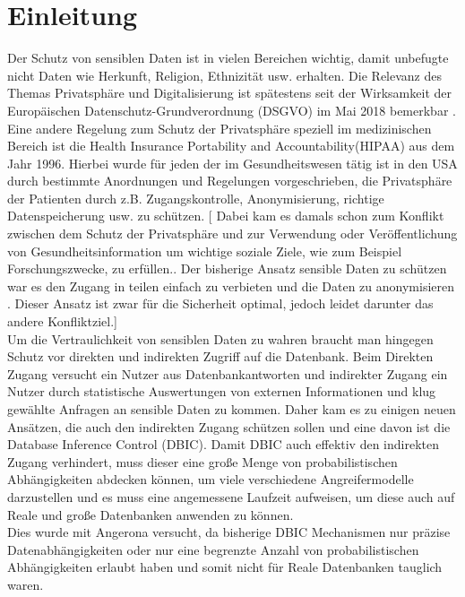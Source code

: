 \documentclass[german,version-2020-11]{uzl-thesis}
\begin{document}
\chapter{Einleitung}
Der Schutz von sensiblen Daten ist in vielen Bereichen wichtig, damit unbefugte nicht Daten wie Herkunft, Religion, Ethnizität usw. erhalten. Die Relevanz des Themas Privatsphäre und Digitalisierung ist spätestens seit der Wirksamkeit der Europäischen Datenschutz-Grundverordnung (DSGVO) im  Mai 2018 bemerkbar \cite{1}. Eine andere Regelung zum Schutz der Privatsphäre speziell im medizinischen Bereich ist die Health Insurance Portability and Accountability(HIPAA) aus dem Jahr 1996. Hierbei wurde für jeden der im Gesundheitswesen tätig ist in den USA durch bestimmte Anordnungen und Regelungen vorgeschrieben, die Privatsphäre der Patienten durch z.B. Zugangskontrolle, Anonymisierung, richtige Datenspeicherung usw. zu schützen. \cite{7}[ Dabei kam es damals schon zum Konflikt zwischen dem Schutz der Privatsphäre und zur Verwendung oder Veröffentlichung von Gesundheitsinformation um wichtige soziale Ziele, wie zum Beispiel Forschungszwecke, zu erfüllen.\cite{8}. Der bisherige Ansatz sensible Daten zu schützen war es den Zugang in teilen einfach zu verbieten und die Daten zu anonymisieren \cite{2}. Dieser Ansatz ist zwar für die Sicherheit optimal, jedoch leidet darunter das andere Konfliktziel.] \\ 
Um die Vertraulichkeit von sensiblen Daten zu wahren braucht man hingegen Schutz vor direkten und indirekten Zugriff auf die Datenbank. Beim Direkten Zugang versucht ein Nutzer aus Datenbankantworten und indirekter Zugang ein Nutzer durch statistische Auswertungen von externen Informationen und klug gewählte Anfragen an sensible Daten zu kommen.  Daher kam es zu einigen neuen Ansätzen, die auch den indirekten Zugang schützen sollen und eine davon ist die Database Inference Control (DBIC). Damit DBIC auch effektiv den indirekten Zugang verhindert, muss dieser eine große Menge von probabilistischen Abhängigkeiten abdecken können, um viele verschiedene Angreifermodelle darzustellen und es muss eine angemessene Laufzeit aufweisen, um diese auch auf Reale und große Datenbanken anwenden zu können.\\
Dies wurde mit Angerona versucht, da bisherige DBIC Mechanismen nur präzise Datenabhängigkeiten oder nur eine begrenzte Anzahl von probabilistischen Abhängigkeiten erlaubt haben und somit nicht für Reale Datenbanken tauglich waren. \cite{6}
\\ \\
\end{document}

